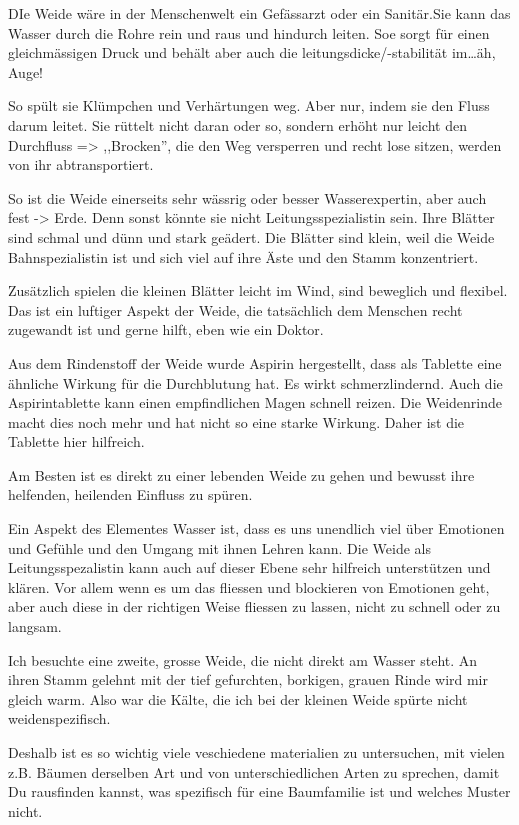 \documentclass[11pt,titlepage,a5paper]{book}
\begin{document}
DIe Weide wäre in der Menschenwelt ein Gefässarzt oder ein Sanitär.Sie kann das Wasser durch die Rohre rein und raus und hindurch leiten. Soe sorgt für einen gleichmässigen Druck und behält aber auch die leitungsdicke/-stabilität im\dots äh, Auge!

So spült sie Klümpchen und Verhärtungen weg. Aber nur, indem sie den Fluss darum leitet. Sie rüttelt nicht daran oder so, sondern erhöht nur leicht den Durchfluss => ,,Brocken'', die den Weg versperren und recht lose sitzen, werden von ihr abtransportiert.

So ist die Weide einerseits sehr wässrig oder besser Wasserexpertin, aber auch fest -> Erde. Denn sonst könnte sie nicht Leitungsspezialistin sein. Ihre Blätter sind schmal und dünn und stark geädert. Die Blätter sind klein, weil die Weide Bahnspezialistin ist und sich viel auf ihre Äste und den Stamm konzentriert.

Zusätzlich spielen die kleinen Blätter leicht im Wind, sind beweglich und flexibel. Das ist ein luftiger Aspekt der Weide, die tatsächlich dem Menschen recht zugewandt ist und gerne hilft, eben wie ein Doktor.

Aus dem Rindenstoff der Weide wurde Aspirin hergestellt, dass als Tablette eine ähnliche Wirkung für die Durchblutung hat. Es wirkt schmerzlindernd. Auch die Aspirintablette kann einen empfindlichen Magen schnell reizen. Die Weidenrinde macht dies noch mehr und hat nicht so eine starke Wirkung. Daher ist die Tablette hier hilfreich.

Am Besten ist es direkt zu einer lebenden Weide zu gehen und bewusst ihre helfenden, heilenden Einfluss zu spüren.

Ein Aspekt des Elementes Wasser ist, dass es uns unendlich viel über Emotionen und Gefühle und den Umgang mit ihnen Lehren kann. Die Weide als Leitungsspezalistin kann auch auf dieser Ebene sehr hilfreich unterstützen und klären. Vor allem wenn es um das fliessen und blockieren von Emotionen geht, aber auch diese in der richtigen Weise fliessen zu lassen, nicht zu schnell oder zu langsam.

Ich besuchte eine zweite, grosse Weide, die nicht direkt am Wasser steht. An ihren Stamm gelehnt mit der tief gefurchten, borkigen, grauen Rinde wird mir gleich warm. Also war die Kälte, die ich bei der kleinen Weide spürte nicht weidenspezifisch.

Deshalb ist es so wichtig viele veschiedene materialien zu untersuchen, mit vielen z.B. Bäumen derselben Art und von unterschiedlichen Arten zu sprechen, damit Du rausfinden kannst, was spezifisch für eine Baumfamilie ist und welches Muster nicht.
\end{document}
